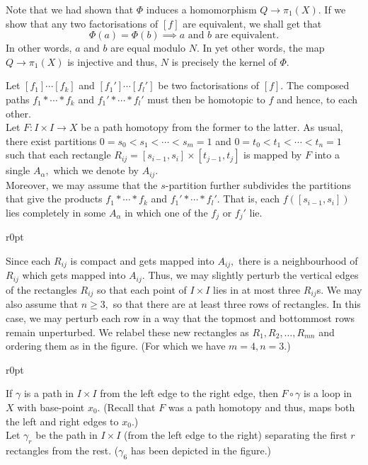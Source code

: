 \documentclass[12pt]{article}
\theoremstyle{definition}
\numberwithin{thm}{section}
\begin{document}
	Note that we had shown that $\Phi$ induces a homomorphism $Q \to \pi_1(X).$ If we show that any two factorisations of $[f]$ are equivalent, we shall get that 
	\begin{equation*} 
		\Phi(a) = \Phi(b) \implies a \text{ and } b \text{ are equivalent.}
	\end{equation*} 
	In other words, $a$ and $b$ are equal modulo $N.$ In yet other words, the map $Q \to \pi_1(X)$ is injective and thus, $N$ is precisely the kernel of $\Phi.$

	Let $[f_1]\cdots[f_k]$ and $[f_1']\cdots[f_l']$ be two factorisations of $[f].$ The composed paths $f_1*\cdots*f_k$ and $f_1'*\cdots*f_l'$ must then be homotopic to $f$ and hence, to each other.\\
	Let $F:I\times I \to X$ be a path homotopy from the former to the latter. As usual, there exist partitions $0 = s_0 < s_1 < \cdots < s_m = 1$ and $0 = t_0 < t_1 < \cdots < t_n = 1$ such that each rectangle $R_{ij} = [s_{i-1}, s_i]\times[t_{j-1}, t_j]$ is mapped by $F$ into a single $A_\alpha,$ which we denote by $A_{ij}.$\\
	Moreover, we may assume that the $s$-partition further subdivides the partitions that give the products $f_1*\cdots*f_k$ and $f_1'*\cdots*f_l'.$ That is, each $f([s_{i-1}, s_i])$ lies completely in some $A_\alpha$ in which one of the $f_j$ or $f_j'$ lie.

	\begin{wrapfigure}{r}{0pt}
		
	\end{wrapfigure}

	Since each $R_{ij}$ is compact and gets mapped into $A_{ij},$ there is a neighbourhood of $R_{ij}$ which gets mapped into $A_{ij}.$ Thus, we may slightly perturb the vertical edges of the rectangles $R_{ij}$ so that each point of $I\times I$ lies in at most three $R_{ij}$s. 
	We may also assume that $n \ge 3,$ so that there are at least three rows of rectangles. In this case, we may perturb each row in a way that the topmost and bottommost rows remain unperturbed. We relabel these new rectangles as $R_1,\allowbreak R_2,\allowbreak \ldots,\allowbreak R_{mn}$ and ordering them as in the figure. (For which we have $m = 4, n = 3.$)

	\begin{wrapfigure}{r}{0pt}
		
	\end{wrapfigure}

	If $\gamma$ is a path in $I\times I$ from the left edge to the right edge, then $F\circ\gamma$ is a loop in $X$ with base-point $x_0.$ (Recall that $F$ was a path homotopy and thus, maps both the left and right edges to $x_0.$)\\
	Let $\gamma_r$ be the path in $I \times I$ (from the left edge to the right) separating the first $r$ rectangles from the rest. ($\gamma_6$ has been depicted in the figure.)
\end{document}
